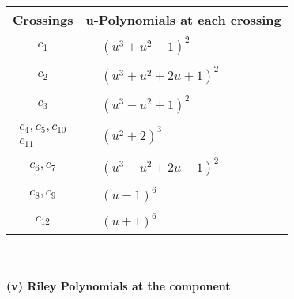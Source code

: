 \documentclass[1p]{elsarticle_modified}
\theoremstyle{definition}
\begin{document}
\begin{tabular}{m{50pt}|m{274pt}}
Crossings & \hspace{64pt}u-Polynomials at each crossing \\
\hline $$\begin{aligned}c_{1}\end{aligned}$$&$\begin{aligned}
&(u^3+u^2-1)^2
\end{aligned}$\\
\hline $$\begin{aligned}c_{2}\end{aligned}$$&$\begin{aligned}
&(u^3+u^2+2 u+1)^2
\end{aligned}$\\
\hline $$\begin{aligned}c_{3}\end{aligned}$$&$\begin{aligned}
&(u^3- u^2+1)^2
\end{aligned}$\\
\hline $$\begin{aligned}c_{4},c_{5},c_{10}\\c_{11}\end{aligned}$$&$\begin{aligned}
&(u^2+2)^3
\end{aligned}$\\
\hline $$\begin{aligned}c_{6},c_{7}\end{aligned}$$&$\begin{aligned}
&(u^3- u^2+2 u-1)^2
\end{aligned}$\\
\hline $$\begin{aligned}c_{8},c_{9}\end{aligned}$$&$\begin{aligned}
&(u-1)^6
\end{aligned}$\\
\hline $$\begin{aligned}c_{12}\end{aligned}$$&$\begin{aligned}
&(u+1)^6
\end{aligned}$\\
\hline
\end{tabular}\\~\\
\newpage\renewcommand{\arraystretch}{1}
\flushleft \textbf{(v) Riley Polynomials at the component}\newline \\
\end{document}
